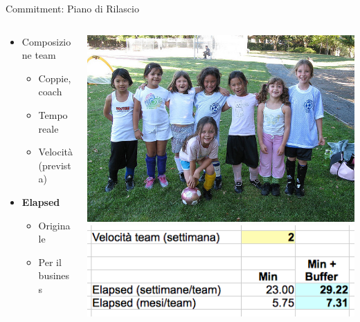 	\begin{frame}{Commitment: Piano di Rilascio}

		\begin{columns}[T]
		    \begin{column}{.5\textwidth}

				\begin{itemize}
					\item Composizione team
					\begin{itemize}
						\item Coppie, coach
						\item Tempo reale
						\item Velocità (prevista)
					\end{itemize}
				\end{itemize}

				\begin{itemize}
					\item \textbf{Elapsed}
					\begin{itemize}
						\item Originale
						\item Per il business
					\end{itemize}
				\end{itemize}
		
	    	\end{column}
		    \begin{column}{.5\textwidth}
				\hspace*{-0.1cm} \includegraphics[scale=0.55]{images/team}
				\\ \vspace*{0.2cm}
				\hspace*{-0.4cm} \includegraphics[scale=0.35]{images/elapsed}
		    \end{column}
		\end{columns}


\end{frame}
